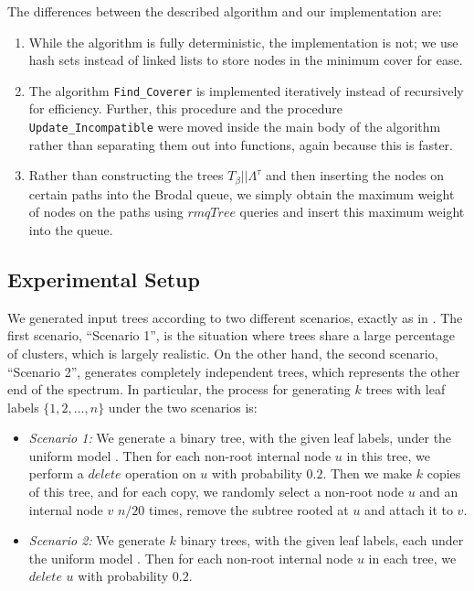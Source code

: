 \documentclass[12pt,a4paper]{article}
\newcommand{\leafset}{\Lambda}
\newcommand{\TB}{T_\beta}
\begin{document}
    The differences between the described algorithm and our implementation are:

    \begin{enumerate}
        \item While the algorithm is fully deterministic, the implementation is not; we use hash sets instead of linked lists to store nodes in the minimum cover for ease.

        \item The algorithm \texttt{Find\_Coverer} is implemented iteratively instead of recursively for efficiency. Further, this procedure and the procedure \texttt{Update\_Incompatible} were moved inside the main body of the algorithm rather than separating them out into functions, again because this is faster.

        \item Rather than constructing the trees $\TB||\leafset^{\tau}$ and then inserting the nodes on certain paths into the Brodal queue, we simply obtain the maximum weight of nodes on the paths using $rmqTree$ queries and insert this maximum weight into the queue.
    \end{enumerate}

    \subsection{Experimental Setup}
    \label{subsec:setup}

    We generated input trees according to two different scenarios, exactly as in \cite{jansson2018algorithms}. The first scenario, ``Scenario 1'', is the situation where trees share a large percentage of clusters, which is largely realistic. On the other hand, the second scenario, ``Scenario 2'', generates completely independent trees, which represents the other end of the spectrum. In particular, the process for generating $k$ trees with leaf labels $\{1, 2, \dots, n\}$ under the two scenarios is:

    \begin{itemize}
        \item \textit{Scenario 1:} We generate a binary tree, with the given leaf labels, under the uniform model \citep{mckenzie2000distributions}. Then for each non-root internal node $u$ in this tree, we perform a $delete$ operation on $u$ with probability $0.2$. Then we make $k$ copies of this tree, and for each copy, we randomly select a non-root node $u$ and an internal node $v$ $n / 20$ times, remove the subtree rooted at $u$ and attach it to $v$.

        \item \textit {Scenario 2:} We generate $k$ binary trees, with the given leaf labels, each under the uniform model \citep{mckenzie2000distributions}. Then for each non-root internal node $u$ in each tree, we $delete$ $u$ with probability $0.2$.
    \end{itemize}
\end{document}
